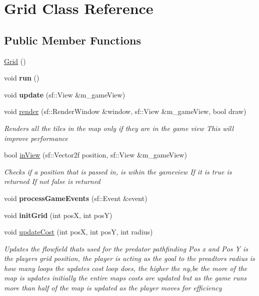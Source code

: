 \hypertarget{class_grid}{}\section{Grid Class Reference}
\label{class_grid}
\subsection*{Public Member Functions}
\begin{DoxyCompactItemize}
\item 
\mbox{\hyperlink{class_grid_a4ac9ff4f63552b4c61ff90fcb35ad66c}{Grid}} ()
\item 
\mbox{\label{class_grid_a0735bd663af0196a76cecb4e5a688542}} 
void {\bfseries run} ()
\item 
\mbox{\label{class_grid_a532d6f18e6bb2bf8ece8077f9f9e7b7b}} 
void {\bfseries update} (sf\+::\+View \&m\+\_\+game\+View)
\item 
void \mbox{\hyperlink{class_grid_aa30713317eef1336131d413213483c0c}{render}} (sf\+::\+Render\+Window \&window, sf\+::\+View \&m\+\_\+game\+View, bool draw)
\begin{DoxyCompactList}\small\item\em Renders all the tiles in the map only if they are in the game view This will improve performance \end{DoxyCompactList}\item 
bool \mbox{\hyperlink{class_grid_a328dbe72e123c3e1fbae0cb018f61402}{in\+View}} (sf\+::\+Vector2f position, sf\+::\+View \&m\+\_\+game\+View)
\begin{DoxyCompactList}\small\item\em Checks if a position that is passed in, is wihin the gameview If it is true is returned If not false is returned \end{DoxyCompactList}\item 
\mbox{\label{class_grid_aab59888bd892a8f1a0dfcce2d665a15e}} 
void {\bfseries process\+Game\+Events} (sf\+::\+Event \&event)
\item 
\mbox{\label{class_grid_ae1886296e8e2b5ac7cc81b03ccb82eb3}} 
void {\bfseries init\+Grid} (int posX, int posY)
\item 
void \mbox{\hyperlink{class_grid_ada7a1971d0a1a29d793eb76551d6e4fa}{update\+Cost}} (int posX, int posY, int radius)
\begin{DoxyCompactList}\small\item\em Updates the flowfield thats used for the predator pathfinding Pos x and Pos Y is the players grid position, the player is acting as the goal to the preadtors radius is how many loops the updates cost loop does, the higher the ny,be the more of the map is updates initially the entire maps costs are updated but as the game runs more than half of the map is updated as the player moves for efficiency \end{DoxyCompactList}\end{DoxyCompactItemize}
